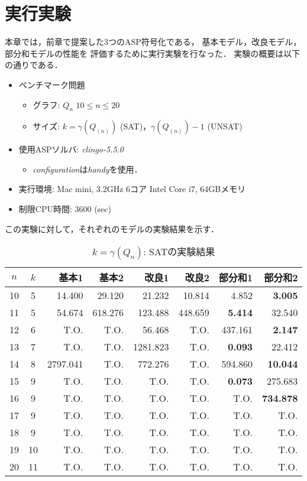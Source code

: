 \chapter{実行実験}\label{chap:experiment}
本章では，前章で提案した3つのASP符号化である，
基本モデル，改良モデル，部分和モデルの性能を
評価するために実行実験を行なった．
実験の概要は以下の通りである．
\begin{itemize}
 \item ベンチマーク問題
 \begin{itemize}
      \item グラフ: $Q_{n}$ $10 \le n \le 20$ 
      \item サイズ: $ k = \gamma(Q_(n))$ (SAT)，$\gamma(Q_(n))-1$ (UNSAT)%
 \end{itemize}
 \item 使用ASPソルバ: \textit{clingo-5.5.0}
       \begin{itemize}
	\item \textit{configuration}は\textit{handy}を使用．
       \end{itemize}
 \item 実行環境: Mac mini, 3.2GHz 6コア Intel Core i7, 64GBメモリ
 \item 制限CPU時間: 3600 (sec)
\end{itemize}

この実験に対して，それぞれのモデルの実験結果を示す．
\begin{table}[ht]
 \caption{$k=\gamma(Q_n)$: SATの実験結果}
 \label{tb:exSAT}
 \centering
 \begin{tabular}{c|c|r|r|r|r|r|r} \hline
  $n$ & $k$ & 基本1 & 基本2 & 改良1 & 改良2 & 部分和1 & 部分和2 \\ \hline
  10 & 5 & 14.400 & 29.120 & 21.232 & 10.814 & 4.852 & \textbf{3.005} \\
  11 & 5 & 54.674 & 618.276 & 123.488 & 448.659 & \textbf{5.414} & 32.540 \\
  12 & 6 & T.O. & T.O. & 56.468 & T.O. & 437.161 & \textbf{2.147} \\
  13 & 7 & T.O. & T.O. & 1281.823 & T.O. & \textbf{0.093} & 22.412 \\
  14 & 8 & 2797.041 & T.O. & 772.276 & T.O. & 594.860 & \textbf{10.044}\\
  15 & 9 & T.O. & T.O. & T.O. & T.O. & \textbf{0.073} & 275.683 \\
  16 & 9 & T.O. & T.O. & T.O. & T.O. & T.O. & \textbf{734.878} \\
  17 & 9 & T.O. & T.O. & T.O. & T.O. & T.O. & T.O. \\
  18 & 9 & T.O. & T.O. & T.O. & T.O. & T.O. & T.O. \\
  19 & 10 & T.O. & T.O. & T.O. & T.O. & T.O. & T.O. \\
  20 & 11 & T.O. & T.O. & T.O. & T.O. & T.O. & T.O. \\ \hline
 \end{tabular}
\end{table}

